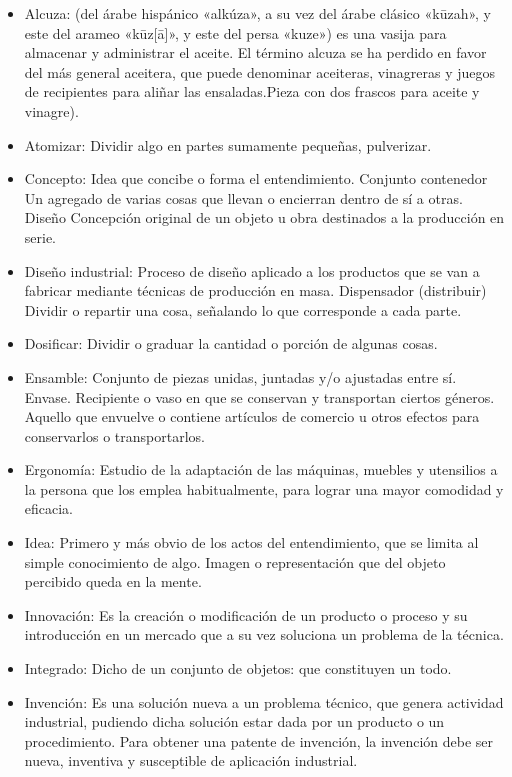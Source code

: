 \begin{itemize}
\item Alcuza:   (del árabe hispánico «alkúza», a su vez del árabe clásico «kūzah», y este del arameo «kūz[ā]», y este del persa «kuze») es una vasija para almacenar y administrar el aceite. El término alcuza se ha perdido en favor del más general aceitera, que puede denominar aceiteras, vinagreras y juegos de recipientes para aliñar las ensaladas.Pieza con dos frascos para aceite y vinagre).
\item Atomizar:         	Dividir algo en partes sumamente pequeñas, pulverizar.
\item Concepto:        	Idea que concibe o forma el entendimiento.
Conjunto contenedor	Un agregado de varias cosas que llevan o encierran dentro de sí a otras.
Diseño  Concepción original de un objeto u obra destinados a la producción en serie.
\item Diseño industrial:          	Proceso de diseño aplicado a los productos que se van a fabricar mediante técnicas de producción en masa.
Dispensador (distribuir) Dividir o repartir una cosa, señalando lo que corresponde a cada parte.
\item Dosificar:          	Dividir o graduar la cantidad o porción de algunas cosas.
\item Ensamble:        	Conjunto de piezas unidas, juntadas y/o ajustadas entre sí.
Envase. Recipiente o vaso en que se conservan y transportan ciertos géneros. Aquello que envuelve o contiene artículos de comercio u otros efectos para conservarlos o transportarlos.
\item Ergonomía:      	Estudio de la adaptación de las máquinas, muebles y utensilios a la persona que los emplea habitualmente, para lograr una mayor comodidad y eficacia.
\item Idea:   	Primero y más obvio de los actos del entendimiento, que se limita al simple conocimiento de algo. Imagen o representación que del objeto percibido queda en la mente.
\item Innovación:     	Es la creación o modificación de un producto o proceso y su introducción en un mercado que a su vez soluciona un problema de la técnica.
\item Integrado:       	Dicho de un conjunto de objetos: que constituyen un todo.
\item Invención:       	Es una solución nueva a un problema técnico, que genera actividad industrial, pudiendo dicha solución estar dada por un producto o un procedimiento. Para obtener una patente de invención, la invención debe ser nueva, inventiva y susceptible de aplicación industrial.

\end{itemize}
